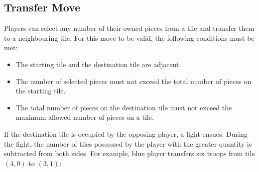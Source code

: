 \documentclass[letterpaper, 12pt]{article}
\begin{document}
\subsection*{Transfer Move}
Players can select any number of their owned pieces from a tile and transfer them to a 
neighbouring tile. For this move to be valid, the following conditions must be met:
\begin{itemize}
  \item The starting tile and the destination tile are adjacent.
  \item The number of selected pieces must not exceed the total number of pieces on the
    starting tile.
  \item The total number of pieces on the destination tile must not exceed the maximum 
    allowed number of pieces on a tile.
\end{itemize}
If the destination tile is occupied by the opposing player, a fight ensues. During the
fight, the number of tiles possessed by the player with the greater quantity is 
subtracted from both sides. For example, blue player transfers six troops from tile
\((4, 0)\) to \((3, 1)\):
\end{document}
